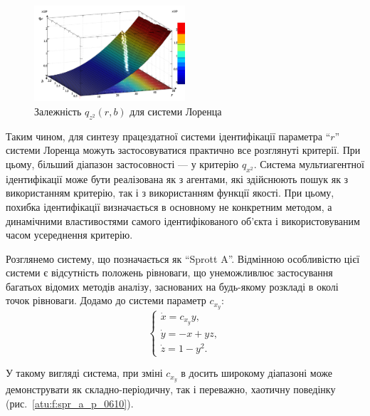 \documentclass[a4paper,13pt]{atuaref}
\begin{document}
\begin{figure}[ht!]
  \centerline{  \includegraphics[width=0.50\textwidth]{p5/p/cha/lor/q2d/lor_qz2_r_b.png}  }
  \caption{Залежність $q_{z^2}(r,b)$ для системи Лоренца}
  \label{atu:f:lor_qz2_r_b}
\end{figure}


Таким чином,
для синтезу працездатної системи ідентифікації параметра ``$r$'' системи
Лоренца можуть застосовуватися практично все розглянуті критерії. При цьому,
більший діапазон застосовності --- у критерію  $q_{x^2}$.
Система мультиагентної ідентифікації може бути реалізована як з агентами, які
здійснюють пошук як з використанням критерію, так і з використанням функції
якості. При цьому, похибка ідентифікації визначається в основному не конкретним
методом, а динамічними властивостями самого ідентифікованого об'єкта і
використовуваним часом усереднення критерію.


Розглянемо систему, що позначається як ``Sprott A''. Відмінною
особливістю цієї системи є відсутність положень рівноваги, що унеможливлює
застосування багатьох відомих методів аналізу, заснованих на будь-якому
розкладі в околі точок рівноваги.
Додамо до системи параметр $c_{x_y}$:
%
%
\begin{equation}
  \begin{cases}
    \dot{x} =  c_{x_y} y, \\
    \dot{y} = -x + yz, \\
    \dot{z} =  1 - y^2.
  \end{cases}
  \label{atu:eq:spr_a}
\end{equation}

У такому вигляді система, при зміні $c_{x_y} $ в досить широкому діапазоні
може демонструвати як складно-періодичну, так і переважно, хаотичну поведінку
(рис.~\ref{atu:f:spr_a_p_0610}).
\end{document}
